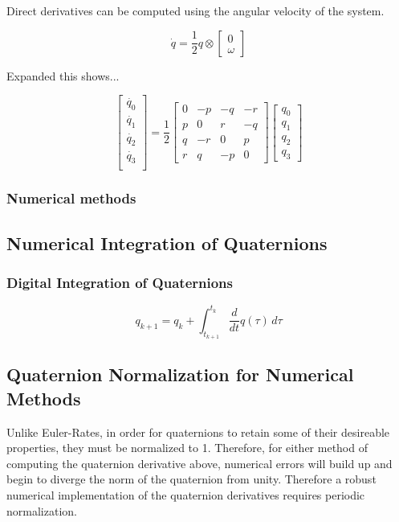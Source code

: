 Direct derivatives can be computed using the angular velocity of the system. 

$$\dot{q} = \frac{1}{2}q
\otimes \begin{bmatrix}
    0 \\ 
    \omega
\end{bmatrix}$$

Expanded this shows... 

$$\begin{bmatrix}
   \dot{q_{0}} \\
   \dot{q_{1}} \\
   \dot{q_{2}} \\
   \dot{q_{3}} \\  
\end{bmatrix} = \frac{1}{2}\begin{bmatrix}
    0 & -p & -q & -r \\
    p & 0 & r & -q \\
    q & -r & 0 & p  \\
    r & q & -p & 0 
    
\end{bmatrix}\begin{bmatrix}
    q_{0} \\
    q_{1} \\
    q_{2} \\
    q_{3} 
 \end{bmatrix} $$

\subsubsection{Numerical methods }


\subsection{Numerical Integration of Quaternions}

\subsubsection{Digital Integration of Quaternions}

$$q_{k+1} = q_{k} + \int_{t_{k+1}}^{t_k} \frac{d}{dt}q(\tau) \,d\tau $$

\subsection{Quaternion Normalization for Numerical Methods}

Unlike Euler-Rates, in order for quaternions to retain some of their desireable properties, they must be normalized to 1. Therefore, for either method of computing the quaternion derivative above, numerical errors will build up and begin to diverge the norm of the quaternion from unity. Therefore a robust numerical implementation of the quaternion derivatives requires periodic normalization. \\


